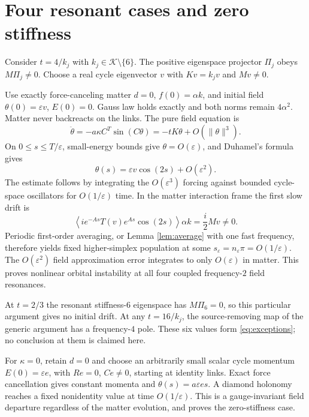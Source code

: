 \documentclass[11pt,a4paper]{article}
\begin{document}
\newpage
\section{Four resonant cases and zero stiffness}
Consider $t=4/k_j$ with $k_j\in\mathcal K\setminus\{6\}$. The positive eigenspace projector $\Pi_j$ obeys $M\Pi_j\ne0$. Choose a real cycle eigenvector $v$ with $Kv=k_jv$ and $Mv\ne0$.

Use exactly force-canceling matter $d=0$, $f(0)=\alpha k$, and initial field $\theta(0)=\varepsilon v$, $E(0)=0$. Gauss law holds exactly and both norms remain $4\alpha^2$. Matter never backreacts on the links. The pure field equation is
\[
\ddot\theta=-a\kappa C^T\sin(C\theta)
=-tK\theta+O(\|\theta\|^3).
\]
On $0\leq s\leq T/\varepsilon$, small-energy bounds give $\theta=O(\varepsilon)$, and Duhamel's formula gives
\begin{equation}
\theta(s)=\varepsilon v\cos(2s)+O(\varepsilon^2).
\end{equation}
The estimate follows by integrating the $O(\varepsilon^3)$ forcing against bounded cycle-space oscillators for $O(1/\varepsilon)$ time. In the matter interaction frame the first slow drift is
\begin{equation}
\left\langle i e^{-As}T(v)e^{As}\cos(2s)\right\rangle\alpha k
=\frac i2Mv\ne0.
\end{equation}
Periodic first-order averaging, or Lemma \ref{lem:average} with one fast frequency, therefore yields fixed higher-simplex population at some $s_\varepsilon=n_\varepsilon\pi=O(1/\varepsilon)$. The $O(\varepsilon^2)$ field approximation error integrates to only $O(\varepsilon)$ in matter. This proves nonlinear orbital instability at all four coupled frequency-$2$ field resonances.

At $t=2/3$ the resonant stiffness-$6$ eigenspace has $M\Pi_6=0$, so this particular argument gives no initial drift. At any $t=16/k_j$, the source-removing map of the generic argument has a frequency-$4$ pole. These six values form \eqref{eq:exceptions}; no conclusion at them is claimed here.

For $\kappa=0$, retain $d=0$ and choose an arbitrarily small scalar cycle momentum $E(0)=\varepsilon e$, with $Re=0$, $Ce\ne0$, starting at identity links. Exact force cancellation gives constant momenta and $\theta(s)=a\varepsilon es$. A diamond holonomy reaches a fixed nonidentity value at time $O(1/\varepsilon)$. This is a gauge-invariant field departure regardless of the matter evolution, and proves the zero-stiffness case.
\end{document}
